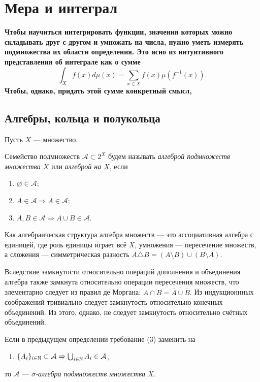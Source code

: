 \section{Мера и интеграл}

{\bf Чтобы научиться интегрировать функции, значения которых можно складывать друг с другом и умножать на числа, нужно уметь измерять подмножества их области определения. Это ясно из интуитивного представления об интеграле как о сумме
\begin{equation*}
	\int_X f(x)d\mu(x)=\sum_{x\in X} f(x)\mu(f^{-1}(x)).
\end{equation*}
Чтобы, однако, придать этой сумме конкретный смысл, 
}

\subsection{Алгебры, кольца и полукольца}
Пусть $X$ --- множество. 
\begin{defin}
	Семейство подмножеств $\mathcal{A}\subset 2^X$ будем называть \textit{алгеброй подмножеств множества $X$} или \textit{алгеброй на $X$}, если
		\begin{enumerate}
			\item $\varnothing\in\mathcal{A}$;
			\item $A\in\mathcal{A}\Rightarrow\overline{A}\in\mathcal{A}$;
			\item $A,B\in\mathcal{A}\Rightarrow A\cup B\in\mathcal{A}$.
		\end{enumerate}
\end{defin}
Как алгебраическая структура алгебра множеств --- это ассоциативная алгебра с единицей, где роль единицы играет всё $X$, умножения --- пересечение множеств, а сложения --- симметрическая разность $A\triangle B=(A\setminus B)\cup(B\setminus A)$.

Вследствие замкнутости относительно операций дополнения и объединения алгебра также замкнута относительно операции пересечения множеств, что элементарно следует из правил де Моргана: $A\cap B=\overline{\overline{A}\cup\overline{B}}$. Из индукционнных соображений тривиально следует замкнутость относительно конечных объединений. Из этого, однако, не следует замкнутость относительно счётных объединений.
\begin{defin}
	Если в предыдущем определении требование (3) заменить на
		\begin{enumerate}
			\item $\{A_i\}_{i\in\mathbb {N}}\subset\mathcal{A}\Rightarrow \bigcup_{i\in\mathbb {N}} A_i\in\mathcal{A}$,
		\end{enumerate}
	то $\mathcal{A}$ --- \textit{$\sigma$-алгебра подмножеств множества $X$}.
\end{defin}

